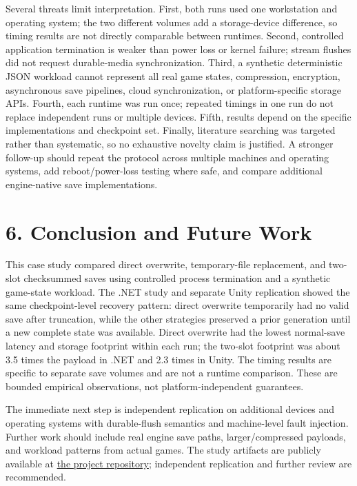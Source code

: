 \documentclass{jepcs}
\begin{document}
Several threats limit interpretation. First, both runs used one workstation and operating system; the two different volumes add a storage-device difference, so timing results are not directly comparable between runtimes. Second, controlled application termination is weaker than power loss or kernel failure; stream flushes did not request durable-media synchronization. Third, a synthetic deterministic JSON workload cannot represent all real game states, compression, encryption, asynchronous save pipelines, cloud synchronization, or platform-specific storage APIs. Fourth, each runtime was run once; repeated timings in one run do not replace independent runs or multiple devices. Fifth, results depend on the specific implementations and checkpoint set. Finally, literature searching was targeted rather than systematic, so no exhaustive novelty claim is justified. A stronger follow-up should repeat the protocol across multiple machines and operating systems, add reboot/power-loss testing where safe, and compare additional engine-native save implementations.

\section{6. Conclusion and Future Work}
This case study compared direct overwrite, temporary-file replacement, and two-slot checksummed saves using controlled process termination and a synthetic game-state workload. The .NET study and separate Unity replication showed the same checkpoint-level recovery pattern: direct overwrite temporarily had no valid save after truncation, while the other strategies preserved a prior generation until a new complete state was available. Direct overwrite had the lowest normal-save latency and storage footprint within each run; the two-slot footprint was about 3.5 times the payload in .NET and 2.3 times in Unity. The timing results are specific to separate save volumes and are not a runtime comparison. These are bounded empirical observations, not platform-independent guarantees.

The immediate next step is independent replication on additional devices and operating systems with durable-flush semantics and machine-level fault injection. Further work should include real engine save paths, larger/compressed payloads, and workload patterns from actual games. The study artifacts are publicly available at \href{https://github.com/zekk01/game-save-study}{the project repository}; independent replication and further review are recommended.
\end{document}
